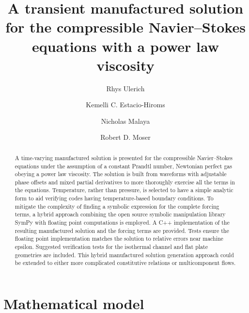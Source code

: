 \documentclass[10pt,reqno]{amsart}
\begin{document}
\title{
    A transient manufactured solution for the compressible Navier--Stokes
    equations with a power law viscosity
}
\author{Rhys Ulerich
        \and Kemelli C. Estacio-Hiroms
        \and Nicholas Malaya
        \and Robert D. Moser}

\begin{abstract}
A time-varying manufactured solution is presented for the compressible
Navier--Stokes equations under the assumption of a constant Prandtl number,
Newtonian perfect gas obeying a power law viscosity.  The solution is built
from waveforms with adjustable phase offsets and mixed partial derivatives to
more thoroughly exercise all the terms in the equations.  Temperature, rather
than pressure, is selected to have a simple analytic form to aid verifying
codes having temperature-based boundary conditions.  To mitigate the complexity
of finding a symbolic expression for the complete forcing terms, a hybrid
approach combining the open source symbolic manipulation library SymPy with
floating point computations is employed.  A C++ implementation of the resulting
manufactured solution and the forcing terms are provided.  Tests ensure the
floating point implementation matches the solution to relative errors near
machine epsilon.  Suggested verification tests for the isothermal channel and
flat plate geometries are included.  This hybrid manufactured solution
generation approach could be extended to either more complicated constitutive
relations or multicomponent flows.
\end{abstract}

\maketitle

\section{Mathematical model}
\end{document}
